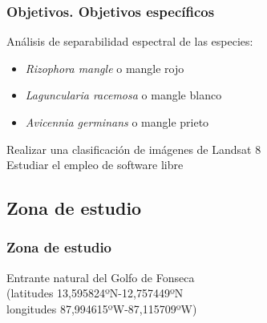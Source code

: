 \documentclass[12pt]{beamer}
\begin{document}
\begin{frame}
\frametitle{Objetivos. Objetivos específicos}
Análisis de separabilidad espectral de las especies:
\begin{itemize}
\item \textit{Rizophora mangle} o mangle rojo
\item \textit{Laguncularia racemosa} o mangle blanco
\item \textit{Avicennia germinans} o mangle prieto
\end{itemize}
Realizar una clasificación de imágenes de Landsat 8\\
Estudiar el empleo de software libre
\end{frame}

\subsection{Zona de estudio}
\begin{frame}
\frametitle{Zona de estudio}
Entrante natural del Golfo de Fonseca\\ (latitudes 13,595824ºN-12,757449ºN\\ longitudes 87,994615ºW-87,115709ºW)
\end{frame}
\end{document}
